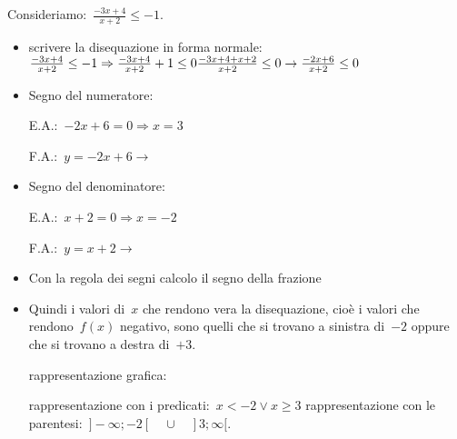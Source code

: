  \begin{esempio}
Consideriamo:~$\frac{-3 x +4}{x+2} \le -1$.
\begin{itemize} [noitemsep]
 \item scrivere la disequazione in forma normale:
 $\frac{-3 x +4}{x+2} \le -1 \Rightarrow \frac{-3 x +4}{x+2} +1 \le 0 \newline
 \frac{-3 x +4 + x +2}{x+2} \le 0 \rightarrow \frac{-2 x +6}{x+2} \le 0$
 \item Segno del numeratore:\\
 \begin{minipage}{.45\textwidth}
  E.A.:~$-2 x +6=0 \Rightarrow x=3$
 \end{minipage}
 \begin{minipage}{.25\textwidth}
  F.A.:~$y=-2 x +6 \rightarrow $
 \end{minipage}
 \begin{minipage}{.3\textwidth}
  
 \end{minipage}
 \item Segno del denominatore:\\
 \begin{minipage}{.45\textwidth}
  E.A.:~$x + 2=0 \Rightarrow x=-2$
 \end{minipage}
 \begin{minipage}{.25\textwidth}
  F.A.:~$y=x +2 \rightarrow $
 \end{minipage}
 \begin{minipage}{.3\textwidth}
  
 \end{minipage}
 \item Con la regola dei segni calcolo il segno della frazione 
   
 \item Quindi i valori di~$x$ che rendono vera la disequazione, cioè i valori
  che rendono~$f(x)$ negativo, sono quelli 
  che si trovano a sinistra di~$-2$ oppure che si trovano a destra di~$+3$. 
 \subitem 
  \begin{minipage}{.35\textwidth}
   rappresentazione grafica: 
  \end{minipage}
  \begin{minipage}{.30\textwidth}
   
  \end{minipage}
 \subitem rappresentazione con i predicati:~$x < -2 \lor x \ge 3$ 
 \subitem rappresentazione con le 
  parentesi:~$]-\infty; -2[ \quad \cup \quad ]3; \infty[$. 
\end{itemize}
 \end{esempio}

